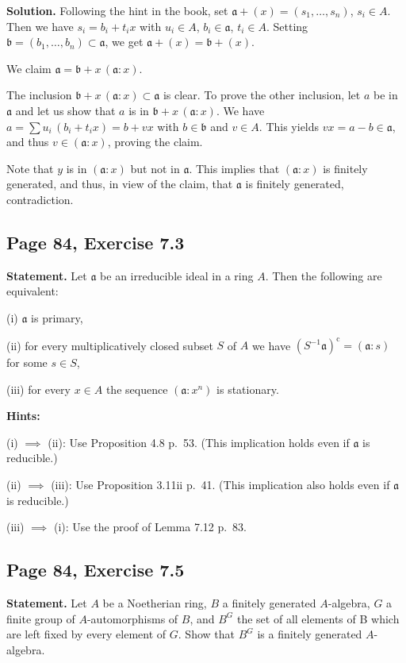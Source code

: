 \documentclass[parskip=half,fontsize=12pt]{scrartcl}%
\newcommand{\oo}{\operatorname}\newcommand{\ooo}{\operatorname*}
\newcommand{\mf}{\mathfrak}
\newcommand{\aaa}{\mf a}
\newcommand{\bbb}{\mf b}
\begin{document}
\textbf{Solution.} Following the hint in the book, set $\aaa+(x)=(s_1,\dots,s_n)$, $s_i\in A$. Then we have $s_i=b_i+t_ix$ with $u_i\in A$, $b_i\in\aaa$, $t_i\in A$. Setting $\bbb=(b_1,\dots,b_n)\subset\aaa$, we get $\aaa+(x)=\bbb+(x)$. 

We claim $\aaa=\bbb+x\,(\aaa:x)$. 

The inclusion $\bbb+x\,(\aaa:x)\subset\aaa$ is clear. To prove the other inclusion, let $a$ be in $\aaa$ and let us show that $a$ is in $\bbb+x\,(\aaa:x)$. We have $a=\sum u_i\,(b_i+t_ix)=b+vx$ with $b\in\bbb$ and $v\in A$. This yields $vx=a-b\in\aaa$, and thus $v\in(\aaa:x)$, proving the claim.

Note that $y$ is in $(\aaa:x)$ but not in $\aaa$. This implies that $(\aaa:x)$ is finitely generated, and thus, in view of the claim, that $\aaa$ is finitely generated, contradiction.

\subsection{Page 84, Exercise 7.3}%

\textbf{Statement.} Let $\aaa$ be an irreducible ideal in a ring $A$. Then the following are equivalent: 

(i) $\aaa$ is primary,

(ii) for every multiplicatively closed subset $S$ of $A$ we have $(S^{-1}\aaa)^{\oo c}=(\aaa:s)$ for some $s\in S$,

(iii) for every $x\in A$ the sequence $(\aaa:x^n)$ is stationary.

\textbf{Hints:} 

(i) $\implies$ (ii): Use %
Proposition 4.8 p.~53. (This implication holds even if $\aaa$ is reducible.)

(ii) $\implies$ (iii): Use Proposition 3.11ii p.~41. (This implication also holds even if $\aaa$ is reducible.)

(iii) $\implies$ (i): Use the proof of Lemma 7.12 p.~83.

\subsection{Page 84, Exercise 7.5}%

\textbf{Statement.} Let $A$ be a Noetherian ring, $B$ a finitely generated $A$-algebra, $G$ a finite group of $A$-automorphisms of $B$, and $B^G$ the set of all elements of B which are left fixed by every element of $G$. Show that $B^G$ is a finitely generated $A$-algebra.
\end{document}
